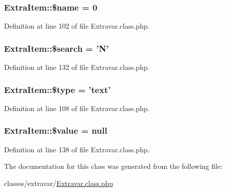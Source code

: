 \hypertarget{classExtraItem_a32694a2408e9e2cca1d680356cf937d3}{
\subsubsection[{\$name}]{\setlength{\rightskip}{0pt plus 5cm}Extra\-Item\-::\$name = 0}}\label{classExtraItem_a32694a2408e9e2cca1d680356cf937d3}


Definition at line 102 of file Extravar.\-class.\-php.

\hypertarget{classExtraItem_a086e30bc8e2d078ad1108d00ae58a60c}{
\subsubsection[{\$search}]{\setlength{\rightskip}{0pt plus 5cm}Extra\-Item\-::\$search = 'N'}}\label{classExtraItem_a086e30bc8e2d078ad1108d00ae58a60c}


Definition at line 132 of file Extravar.\-class.\-php.

\hypertarget{classExtraItem_ac965cc202d067c0449be9976045fd4be}{
\subsubsection[{\$type}]{\setlength{\rightskip}{0pt plus 5cm}Extra\-Item\-::\$type = 'text'}}\label{classExtraItem_ac965cc202d067c0449be9976045fd4be}


Definition at line 108 of file Extravar.\-class.\-php.

\hypertarget{classExtraItem_a46622b49026acdfce833d5118a43986d}{
\subsubsection[{\$value}]{\setlength{\rightskip}{0pt plus 5cm}Extra\-Item\-::\$value = null}}\label{classExtraItem_a46622b49026acdfce833d5118a43986d}


Definition at line 138 of file Extravar.\-class.\-php.



The documentation for this class was generated from the following file\-:\begin{DoxyCompactItemize}
\item 
classes/extravar/\hyperlink{Extravar_8class_8php}{Extravar.\-class.\-php}\end{DoxyCompactItemize}
